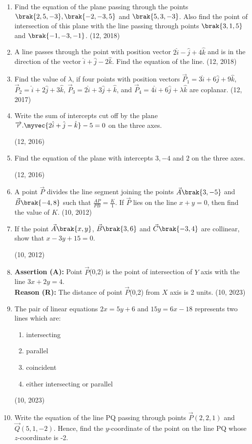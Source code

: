 \begin{enumerate}[label=\thesubsection.\arabic*, ref=\thesubsection.\theenumi]
\item Find the  equation of the plane passing through the points $\brak{2,5,-3},\brak{-2,-3,5}$ and $\brak{5,3,-3}$. Also find the point of intersection of this plane with the line passing through points $\brak{3,1,5}$ and $\brak{-1,-3,-1}$.
\hfill (12, 2018)
\item A line passes through the point with position vector $2\hat{i}-\hat{j}+4\hat{k}$ and is in the direction of the vector $\hat{i}+\hat{j}-2\hat{k}$. Find the equation of the line. 
\hfill (12, 2018) 
    \item Find the value of $\lambda$, if four points with position vectors $\vec{P}_1 = 3\hat{i} + 6\hat{j} + 9\hat{k}$, $\vec{P}_2 = \hat{i} + 2\hat{j} + 3\hat{k}$, $\vec{P}_3 = 2\hat{i} + 3\hat{j} + \hat{k}$, and $\vec{P}_4 = 4\hat{i} + 6\hat{j} + \lambda\hat{k}$ are coplanar. \hfill (12, 2017)
\item Write the sum of intercepts cut off by the plane $\overrightarrow{r}.\myvec{2\hat{i}+\hat{j}-\hat{k}} - 5 = 0$ on the three axes. 

	\hfill (12, 2016)
\item Find the equation of the plane with intercepts $3,-4$ and $2$ on the three axes.

	\hfill (12, 2016)
\item A point $\vec{P}$ divides the line segment joining the points $\vec{A}\brak{3,-5}$ and $\vec{B}\brak{-4,8}$ such that $\frac{AP}{PB} = \frac{K}{1}$. If $\vec{P}$ lies on the line $x + y = 0$, then find the value of $K$. 
\hfill (10, 2012)
\item If the point $\vec{A}\brak{x,y}$, $\vec{B}\brak{3,6}$ and $\vec{C}\brak{-3,4}$ are collinear, show that $x - 3y + 15 = 0$. 

\hfill (10, 2012)
\item \textbf{Assertion (A):} Point $\vec{P}$(0,2) is the point of intersection of $Y$ axis with  the line $3x+2y=4$.\\
    \textbf{Reason (R):} The distance of point $\vec{P}$(0,2) from $X$ axis is 2 units. \hfill (10, 2023)
  \item The pair of linear equations $2x=5y+6$ and $15y=6x-18$ represents two lines which are:
      \begin{enumerate}
        \item intersecting
        \item parallel
        \item coincident
        \item either intersecting or parallel
      \end{enumerate} \hfill (10, 2023)
\item Write the equation of the line PQ passing through points $\vec{P}(2,2,1)$ and $\vec{Q}(5,1,-2)$. Hence, find the $y$-coordinate of the point on the line PQ whose $z$-coordinate is -2.


\end{enumerate}
